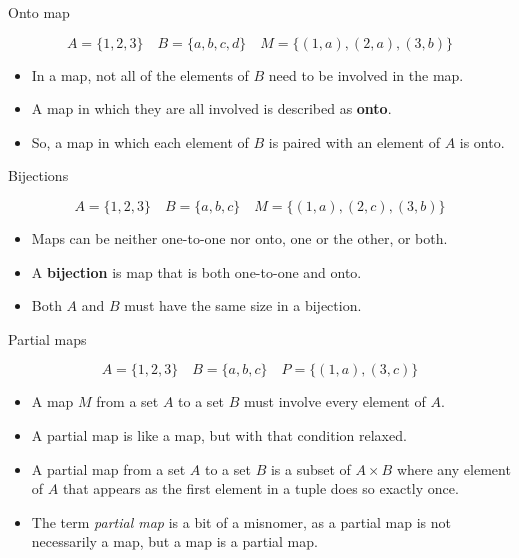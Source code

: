\begin{frame}{Onto map}
  \begin{topdisp}
    $$ A = \{1,2,3\} \quad  B = \{a,b,c,d\} \quad  M = \{ (1,a), (2,a), (3,b) \} $$
  \end{topdisp}
  \begin{itemize}
    \setlength\itemsep{3mm}
    \item In a map, not all of the elements of $B$ need to be involved in the map.
    \item A map in which they are all involved is described as \textbf{onto}.
    \item So, a map in which each element of $B$ is paired with an element of $A$ is onto.
  \end{itemize}
\end{frame}

\begin{frame}{Bijections}
  \begin{topdisp}
    $$ A = \{1,2,3\} \quad  B = \{a,b,c\} \quad  M = \{ (1,a), (2,c), (3,b) \} $$
  \end{topdisp}
  \begin{itemize}
    \setlength\itemsep{3mm}
    \item Maps can be neither one-to-one nor onto, one or the other, or both.
    \item A \textbf{bijection} is map that is both one-to-one and onto.
    \item Both $A$ and $B$ must have the same size in a bijection.
  \end{itemize}
\end{frame}


\begin{frame}{Partial maps}
  \begin{topdisp}
    $$ A = \{1,2,3\} \quad  B = \{a,b,c\} \quad  P = \{ (1,a), (3,c) \} $$
  \end{topdisp}
  \begin{itemize}
    \setlength\itemsep{3mm}
    \item A map $M$ from a set $A$ to a set $B$ must involve every element of $A$.
    \item A partial map is like a map, but with that condition relaxed.
    \item A partial map from a set $A$ to a set $B$ is a subset of $A \times B$ where any element of $A$ that appears as the first element in a tuple does so exactly once.
    \item The term \emph{partial map} is a bit of a misnomer, as a partial map is not necessarily a map, but a map is a partial map.
  \end{itemize}
\end{frame}



